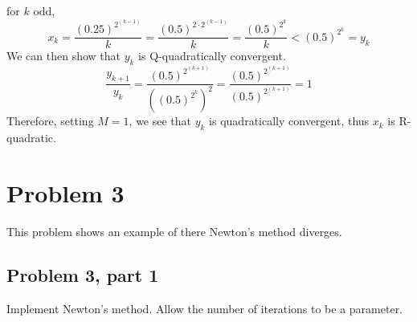 \begin{solution}
\begin{itemize}
        \hop
        for $k$ odd, 
        \[
        x_k = \frac{(0.25)^{2^{(k-1)}}}{k} = \frac{(0.5)^{2\cdot 2^{(k-1)}}}{k} = \frac{(0.5)^{2^k}}{k} < (0.5)^{2^k} = y_k
        \]
        \newpage
        We can then show that $y_k$ is Q-quadratically convergent.
        \[
        \frac{y_{k+1}}{y_k} = \frac{(0.5)^{2^{(k+1)}}}{((0.5)^{2^{k}})^2} = \frac{(0.5)^{2^{(k+1)}}}{(0.5)^{2^{(k+1)}}} = 1
        \]
        Therefore, setting $M = 1$, we see that $y_k$ is quadratically convergent, thus $x_k$ is R-quadratic.
     \end{itemize}
 \end{solution}

\newpage
 \section{Problem 3}
 This problem shows an example of there Newton's method diverges.
 
 \subsection{Problem 3, part 1}
 Implement Newton's method. Allow the number of iterations to be a parameter.
